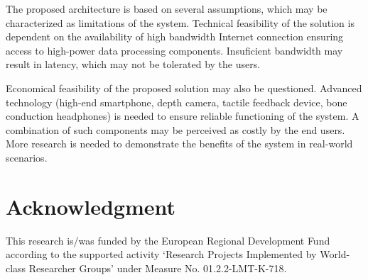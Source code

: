 \documentclass[10pt,conference,compsocconf]{IEEEtran}
\begin{document}

The proposed architecture is based on several assumptions, which may be characterized as limitations of the system. Technical feasibility of the solution is dependent on the availability of high bandwidth Internet connection ensuring access to high-power data processing components. Insuficient bandwidth may result in latency, which may not be tolerated by the users.  



Economical feasibility of the proposed solution may also be questioned. Advanced technology (high-end smartphone, depth camera, tactile feedback device, bone conduction headphones) is needed to ensure reliable functioning of the system. A combination of such components may be perceived as costly by the end users. More research is needed to demonstrate the benefits of the system in real-world scenarios. 







\section*{Acknowledgment}
This research is/was funded by the European Regional Development Fund according to the supported activity ‘Research Projects Implemented by World-class Researcher Groups’ under Measure No. 01.2.2-LMT-K-718.

\end{document}
